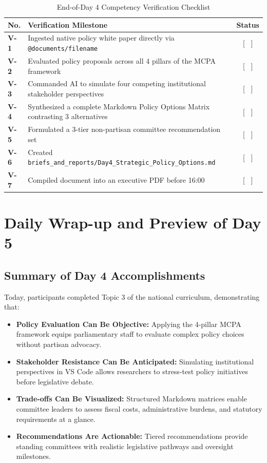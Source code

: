 \documentclass[11pt, a4paper]{report}
\begin{document}
\begin{table}[htbp]
\centering
\caption{End-of-Day 4 Competency Verification Checklist}
\vspace{0.2cm}
\begin{tabular}{@{}>{\bfseries}p{1.2cm}p{10cm}c@{}}
\toprule
No. & Verification Milestone & Status \\
\midrule
V-1 & Ingested native policy white paper directly via \texttt{@documents/filename} & [ \ ] \\
V-2 & Evaluated policy proposals across all 4 pillars of the MCPA framework & [ \ ] \\
V-3 & Commanded AI to simulate four competing institutional stakeholder perspectives & [ \ ] \\
V-4 & Synthesized a complete Markdown Policy Options Matrix contrasting 3 alternatives & [ \ ] \\
V-5 & Formulated a 3-tier non-partisan committee recommendation set & [ \ ] \\
V-6 & Created \texttt{briefs\_and\_reports/Day4\_Strategic\_Policy\_Options.md} & [ \ ] \\
V-7 & Compiled document into an executive PDF before 16:00 & [ \ ] \\
\bottomrule
\end{tabular}
\end{table}

\newpage

\chapter{Daily Wrap-up and Preview of Day 5}

\section{Summary of Day 4 Accomplishments}
Today, participants completed Topic 3 of the national curriculum, demonstrating that:
\begin{itemize}[label=-]
    \item \textbf{Policy Evaluation Can Be Objective:} Applying the 4-pillar MCPA framework equips parliamentary staff to evaluate complex policy choices without partisan advocacy.
    \item \textbf{Stakeholder Resistance Can Be Anticipated:} Simulating institutional perspectives in VS Code allows researchers to stress-test policy initiatives before legislative debate.
    \item \textbf{Trade-offs Can Be Visualized:} Structured Markdown matrices enable committee leaders to assess fiscal costs, administrative burdens, and statutory requirements at a glance.
    \item \textbf{Recommendations Are Actionable:} Tiered recommendations provide standing committees with realistic legislative pathways and oversight milestones.
\end{itemize}
\end{document}
